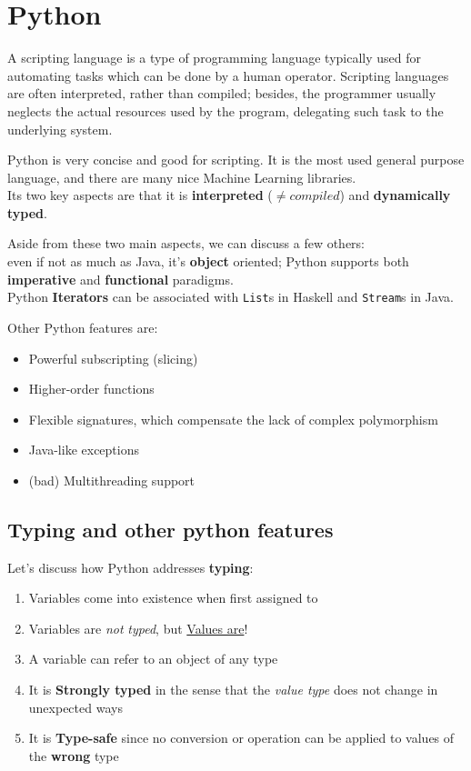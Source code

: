 \chapter{Python}

\begin{definition}
   
   A scripting language is a type of programming language typically used for automating tasks which can be done by a human operator. Scripting languages are often interpreted, rather than compiled; besides, the programmer usually neglects the actual resources used by the program, delegating such task to the underlying system.
   
\end{definition}

Python is very concise and good for scripting.
It is the most used general purpose language, and there are many nice Machine Learning libraries.\\
Its two key aspects are that it is \textbf{interpreted} ($\neq compiled$) and \textbf{dynamically typed}.

Aside from these two main aspects, we can discuss a few others:\\
even if not as much as Java, it's \textbf{object} oriented;
Python supports both \textbf{imperative} and \textbf{functional} paradigms.\\
Python \textbf{Iterators} can be associated with \texttt{List}s in Haskell and \texttt{Stream}s in Java.
{Other Python features are:\ns
\begin{itemize}
   \item Powerful subscripting (slicing)
   \item Higher-order functions
   \item Flexible signatures, which compensate the lack of complex polymorphism
   \item Java-like exceptions
   \item (bad) Multithreading support
\end{itemize}}

\section{Typing and other python features}
Let's discuss how Python addresses \textbf{typing}:
\begin{enumerate}
   \item Variables come into existence when first assigned to
   \item Variables are \textit{not} \textit{typed}, but \underline{Values are}!
   \item A variable can refer to an object of any type
   \item It is \textbf{Strongly typed} in the sense that the \textit{value type} does not change in unexpected ways
   \item It is \textbf{Type-safe} since no conversion or operation can be applied to values of the \textbf{wrong} type
\end{enumerate}


